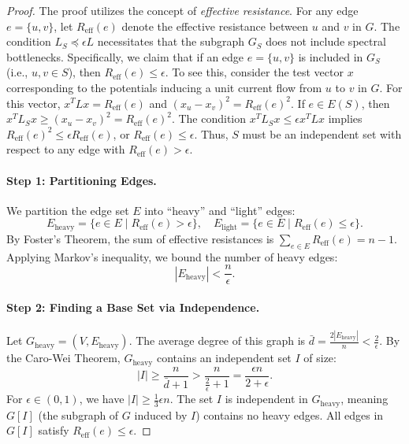 \documentclass{article}
\begin{document}
\begin{proof}
The proof utilizes the concept of \emph{effective resistance}. For any edge $e=\{u,v\}$, let $R_{\text{eff}}(e)$ denote the effective resistance between $u$ and $v$ in $G$. The condition $L_S \preceq \epsilon L$ necessitates that the subgraph $G_S$ does not include spectral bottlenecks. Specifically, we claim that if an edge $e=\{u,v\}$ is included in $G_S$ (i.e., $u,v \in S$), then $R_{\text{eff}}(e) \le \epsilon$.
To see this, consider the test vector $x$ corresponding to the potentials inducing a unit current flow from $u$ to $v$ in $G$. For this vector, $x^T L x = R_{\text{eff}}(e)$ and $(x_u - x_v)^2 = R_{\text{eff}}(e)^2$. If $e \in E(S)$, then $x^T L_S x \ge (x_u - x_v)^2 = R_{\text{eff}}(e)^2$. The condition $x^T L_S x \le \epsilon x^T L x$ implies $R_{\text{eff}}(e)^2 \le \epsilon R_{\text{eff}}(e)$, or $R_{\text{eff}}(e) \le \epsilon$.
Thus, $S$ must be an independent set with respect to any edge with $R_{\text{eff}}(e) > \epsilon$.

\paragraph{Step 1: Partitioning Edges.}
We partition the edge set $E$ into ``heavy'' and ``light'' edges:
\[
E_{\text{heavy}} = \{ e \in E \mid R_{\text{eff}}(e) > \epsilon \}, \quad E_{\text{light}} = \{ e \in E \mid R_{\text{eff}}(e) \leq \epsilon \}.
\]
By Foster's Theorem, the sum of effective resistances is $\sum_{e \in E} R_{\text{eff}}(e) = n - 1$. Applying Markov's inequality, we bound the number of heavy edges:
\[
|E_{\text{heavy}}| < \frac{n}{\epsilon}.
\]

\paragraph{Step 2: Finding a Base Set via Independence.}
Let $G_{\text{heavy}} = (V, E_{\text{heavy}})$. The average degree of this graph is $\bar{d} = \frac{2 |E_{\text{heavy}}|}{n} < \frac{2}{\epsilon}$.
By the Caro-Wei Theorem, $G_{\text{heavy}}$ contains an independent set $I$ of size:
\[
|I| \geq \frac{n}{\bar{d} + 1} > \frac{n}{\frac{2}{\epsilon} + 1} = \frac{\epsilon n}{2 + \epsilon}.
\]
For $\epsilon \in (0, 1)$, we have $|I| \geq \frac{1}{3} \epsilon n$.
The set $I$ is independent in $G_{\text{heavy}}$, meaning $G[I]$ (the subgraph of $G$ induced by $I$) contains no heavy edges. All edges in $G[I]$ satisfy $R_{\text{eff}}(e) \leq \epsilon$.


\end{proof}
\end{document}
